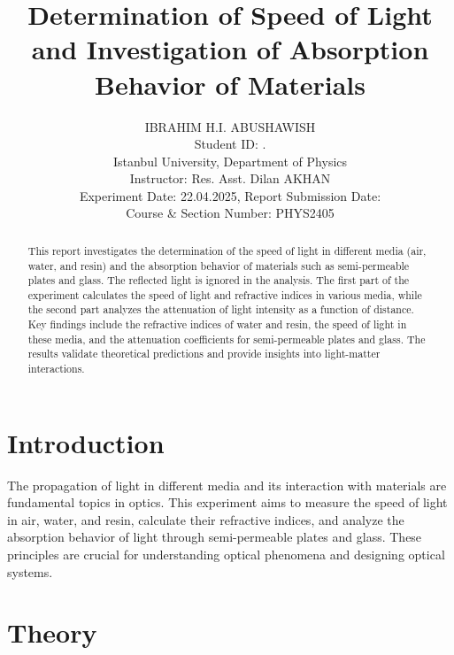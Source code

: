 \documentclass[journal]{IEEEtran}
\begin{document}
\title{Determination of Speed of Light and Investigation of Absorption Behavior of Materials}
\author{IBRAHIM H.I. ABUSHAWISH \\

{\small Student ID: \hspace{1.5cm}. \\ 
Istanbul University, Department of Physics \\
Instructor: Res. Asst. Dilan AKHAN \\
Experiment Date: 22.04.2025, Report Submission Date: \\
Course \& Section Number: PHYS2405}}


\maketitle

\begin{abstract}
    This report investigates the determination of the speed of light in different media (air, water, and resin) and the absorption behavior of materials such as semi-permeable plates and glass. The reflected light is ignored in the analysis. The first part of the experiment calculates the speed of light and refractive indices in various media, while the second part analyzes the attenuation of light intensity as a function of distance. Key findings include the refractive indices of water and resin, the speed of light in these media, and the attenuation coefficients for semi-permeable plates and glass. The results validate theoretical predictions and provide insights into light-matter interactions.
\end{abstract}

\section{Introduction}
The propagation of light in different media and its interaction with materials are fundamental topics in optics. This experiment aims to measure the speed of light in air, water, and resin, calculate their refractive indices, and analyze the absorption behavior of light through semi-permeable plates and glass. These principles are crucial for understanding optical phenomena and designing optical systems.

\section{Theory}
\end{document}
